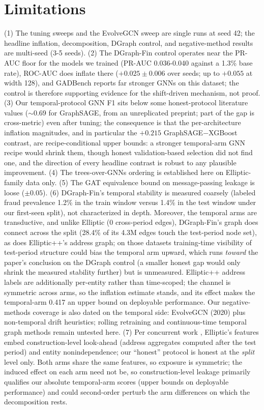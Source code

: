 \documentclass{article}
\begin{document}
\section{Limitations}
\label{sec:limitations}
(1) The tuning sweeps and the EvolveGCN sweep are single runs at seed 42; the
headline inflation, decomposition, DGraph control, and negative-method results are
multi-seed (3-5 seeds). (2) The DGraph-Fin control operates near the
PR-AUC floor for the models we trained (PR-AUC 0.036-0.040 against a 1.3\% base
rate), ROC-AUC does inflate there ($+0.025\pm0.006$ over seeds; up to $+0.055$ at
width 128), and GADBench reports far stronger GNNs on this dataset; the control
is therefore supporting evidence for the shift-driven mechanism, not proof. (3)
Our temporal-protocol GNN F1 sits below some honest-protocol literature values
($\sim$0.69 for GraphSAGE, from an unreplicated preprint; part of the gap is
cross-metric) even after tuning; the consequence is that the per-architecture
inflation magnitudes, and in particular the $+0.215$ GraphSAGE$-$XGBoost
contrast, are recipe-conditional upper bounds: a stronger temporal-arm GNN
recipe would shrink them, though honest validation-based selection did not find
one, and the direction of every headline contrast is robust to any plausible
improvement. (4) The trees-over-GNNs ordering is established here on
Elliptic-family data only. (5) The GAT equivalence bound on message-passing leakage is loose
($\pm 0.05$). (6) DGraph-Fin's temporal stability is measured coarsely (labeled
fraud prevalence 1.2\% in the train window versus 1.4\% in the test window under
our first-seen split), not characterized in depth. Moreover, the temporal arms
are transductive, and unlike Elliptic (0 cross-period edges), DGraph-Fin's graph
does connect across the split (28.4\% of its 4.3M edges touch the test-period
node set), as does Elliptic++'s address graph; on those datasets training-time
visibility of test-period structure could bias the temporal arm upward, which
runs \emph{toward} the paper's conclusion on the DGraph control (a smaller
honest gap would only shrink the measured stability further) but is unmeasured.
Elliptic++ address labels are additionally per-entity rather than time-scoped;
the channel is symmetric across arms, so the inflation estimate stands, and its
effect makes the temporal-arm 0.417 an upper bound on deployable performance.
Our negative-methods coverage is also dated on the temporal side: EvolveGCN
(2020) plus non-temporal drift heuristics; rolling retraining and
continuous-time temporal graph methods remain untested here. (7) Per concurrent work
\citep{safar2026opacity}, Elliptic's features embed construction-level look-ahead
(address aggregates computed after the test period) and entity nonindependence;
our ``honest'' protocol is honest at the \emph{split} level only. Both arms share
the same features, so exposure is symmetric; the induced effect on each arm need
not be, so construction-level leakage primarily qualifies our absolute
temporal-arm scores (upper bounds on deployable performance) and could
second-order perturb the arm differences on which the decomposition rests.
\end{document}
